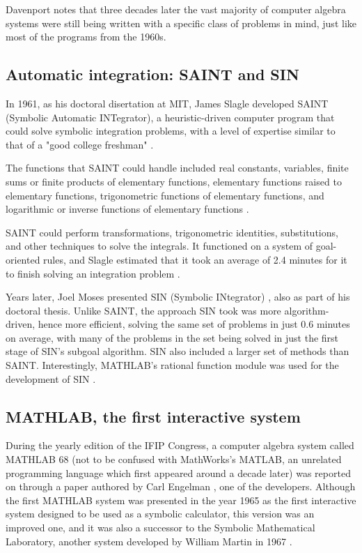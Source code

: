 Davenport \parencite*{davenport1994computer} notes that three decades later the vast majority of computer algebra systems were still being written with a specific class of problems in mind, just like most of the programs from the 1960s.

\subsection{Automatic integration: SAINT and SIN}\label{subsec:automatic-integration-saint-and-sin}

In 1961, as his doctoral disertation at MIT, James Slagle developed SAINT (Symbolic Automatic INTegrator), a heuristic-driven computer program that could solve symbolic integration problems, with a level of expertise similar to that of a "good college freshman" \parencite{slagle1963heuristic,geddes1992algorithms}.

The functions that SAINT could handle included real constants, variables, finite sums or finite products of elementary functions, elementary functions raised to elementary functions, trigonometric functions of elementary functions, and logarithmic or inverse functions of elementary functions \parencite{slagle1963heuristic}.

SAINT could perform transformations, trigonometric identities, substitutions, and other techniques to solve the integrals. It functioned on a system of goal-oriented rules, and Slagle estimated that it took an average of 2.4 minutes for it to finish solving an integration problem \parencite{slagle1963heuristic}.

Years later, Joel Moses presented SIN (Symbolic INtegrator) \parencite*{moses1967symbolic}, also as part of his doctoral thesis. Unlike SAINT, the approach SIN took was more algorithm-driven, hence more efficient, solving the same set of problems in just 0.6 minutes on average, with many of the problems in the set being solved in just the first stage of SIN's subgoal algorithm. SIN also included a larger set of methods than SAINT. Interestingly, MATHLAB's rational function module was used for the development of SIN \parencite{moses1967symbolic}.

\subsection{MATHLAB, the first interactive system}\label{subsec:mathlab-68-the-first-interactive-system}

During the yearly edition of the IFIP Congress, a computer algebra system called MATHLAB 68 (not to be confused with MathWorks's MATLAB, an unrelated programming language which first appeared around a decade later) was reported on through a paper authored by Carl Engelman \parencite*{engelman1968mathlab}, one of the developers. Although the first MATHLAB system was presented in the year 1965 as the first interactive system designed to be used as a symbolic calculator, this version was an improved one, and it was also a successor to the Symbolic Mathematical Laboratory, another system developed by William Martin in 1967 \parencite{geddes1992algorithms}.

